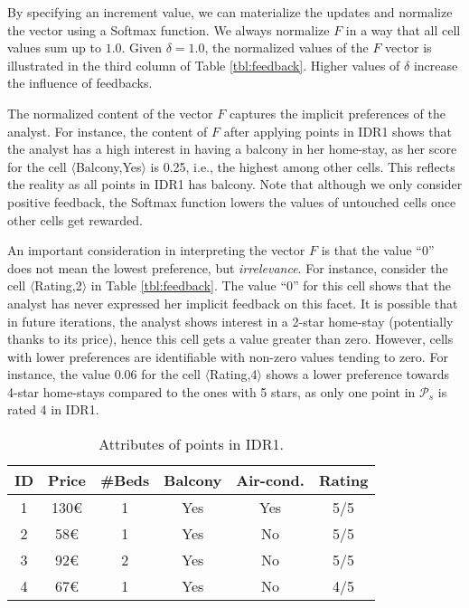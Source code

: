 \documentclass[sigconf,edbt]{acmart-edbt2019}
\begin{document}
\vspace{2pt}
By specifying an increment value, we can materialize the updates and normalize the vector using a Softmax function. We always normalize $F$ in a way that all cell values sum up to $1.0$. Given $\delta = 1.0$, the normalized values of the $F$ vector is illustrated in the third column of Table \ref{tbl:feedback}. Higher values of $\delta$ increase the influence of feedbacks.

\vspace{2pt}
The normalized content of the vector $F$ captures the implicit preferences of the analyst. For instance, the content of $F$ after applying points in IDR1 shows that the analyst has a high interest in having a balcony in her home-stay, as her score for the cell $\langle$Balcony,Yes$\rangle$ is 0.25, i.e., the highest among other cells. This reflects the reality as all points in IDR1 has balcony. Note that although we only consider positive feedback, the Softmax function lowers the values of untouched cells once other cells get rewarded.

\vspace{2pt}
An important consideration in interpreting the vector $F$ is that the value ``0'' does not mean the lowest preference, but {\em irrelevance}. For instance, consider the cell $\langle$Rating,2$\rangle$ in Table \ref{tbl:feedback}. The value ``0'' for this cell shows that the analyst has never expressed her implicit feedback on this facet. It is possible that in future iterations, the analyst shows interest in a 2-star home-stay (potentially thanks to its price), hence this cell gets a value greater than zero. However, cells with lower preferences are identifiable with non-zero values tending to zero. For instance, the value 0.06 for the cell $\langle$Rating,4$\rangle$ shows a lower preference towards 4-star home-stays compared to the ones with 5 stars, as only one point in $\mathcal{P}_s$ is rated 4 in IDR1.

\begin{table}[t]
\centering
\caption{Attributes of points in IDR1.}
\label{tbl:attribs}
\begin{tabular}{|c|c|c|c|c|c|}
\hline
\textbf{ID} & \textbf{Price} & \textbf{\#Beds} & \textbf{Balcony} & \textbf{Air-cond.} & \textbf{Rating} \\ \hline
1                     & 130\euro           & 1               & Yes           & Yes                & 5/5             \\ \hline
2                     & 58\euro            & 1               & Yes           & No                 & 5/5             \\ \hline
3                     & 92\euro            & 2               & Yes           & No                 & 5/5             \\ \hline
4                     & 67\euro            & 1               & Yes           & No                 & 4/5             \\ \hline
\end{tabular}
\end{table}
\end{document}
